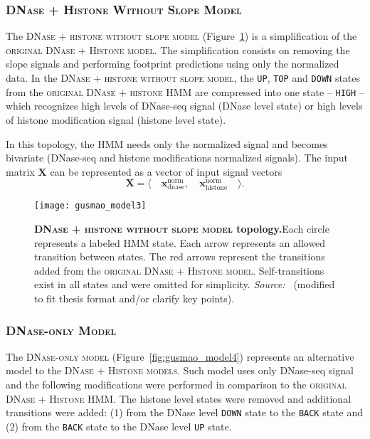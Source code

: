 \subsubsection{\textsc{DNase + Histone Without Slope Model}}

The \textsc{DNase + histone without slope model} (Figure~\ref{fig:gusmao_model3}) is a simplification of the \textsc{original DNase + Histone model}. The simplification consists on removing the slope signals and performing footprint predictions using only the normalized data. In the \textsc{DNase + histone without slope model}, the {\tt UP}, {\tt TOP} and {\tt DOWN} states from the \textsc{original DNase + histone} HMM are compressed into one state -- {\tt HIGH} -- which recognizes high levels of DNase-seq signal (DNase level state) or high levels of histone modification signal (histone level state).

In this topology, the HMM needs only the normalized signal and becomes bivariate (DNase-seq and histone modifications normalized signals). The input matrix $\mathbf{X}$ can be represented as a vector of input signal vectors
\begin{equation}
  \label{eq:signal.m3}
  \mathbf{X} = \langle \quad \mathbf{x}^{\text{norm}}_{\text{dnase}} ,\quad \mathbf{x}^{\text{norm}}_{\text{histone}} \quad \rangle .
\end{equation}

\begin{figure}[h!]
\centering
\texttt{[image: gusmao\_model3]}
\caption[\textsc{DNase + histone without slope model} topology]{\textbf{\textsc{DNase + histone without slope model} topology.}Each circle represents a labeled HMM state. Each arrow represents an allowed transition between states. The red arrows represent the transitions added from the \textsc{original DNase + Histone model}. Self-transitions exist in all states and were omitted for simplicity. \emph{Source:~\cite{gusmao2014}} (modified to fit thesis format and/or clarify key points).}
\label{fig:gusmao_model3}
\end{figure}

\subsubsection{\textsc{DNase-only Model}}

The \textsc{DNase-only model} (Figure~\ref{fig:gusmao_model4}) represents an alternative model to the \textsc{DNase + Histone models}. Such model uses only DNase-seq signal and the following modifications were performed in comparison to the \textsc{original DNase + Histone} HMM. The histone level states were removed and additional transitions were added: (1) from the DNase level {\tt DOWN} state to the {\tt BACK} state and (2) from the {\tt BACK} state to the DNase level {\tt UP} state.


